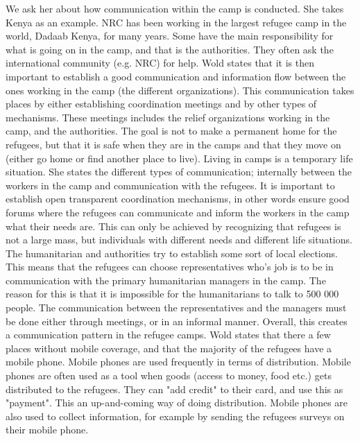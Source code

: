 We ask her about how communication within the camp is conducted. She takes Kenya as an example. NRC has been working in the largest refugee camp in the world, Dadaab Kenya, for many years.  Some have the main responsibility for what is going on in the camp, and that is the  authorities. They often ask the international community (e.g. NRC) for help. Wold states that it is then important to establish a good communication and information flow between the ones working in the camp (the different organizations). This communication takes places by either establishing coordination meetings and by other types of mechanisms. These meetings includes the relief organizations working in the camp, and the authorities. The goal is not to make a permanent home for the refugees, but that it is safe when they are in the camps and that they move on (either go home or find another place to live). Living in camps is a temporary life situation. She states the different types of communication; internally between the workers in the camp and communication with the refugees. It is important to establish open transparent coordination mechanisms, in other words ensure good forums where the refugees can communicate and inform the workers in the camp what their needs are. This can only be achieved by recognizing that refugees is not a large mass, but individuals with different needs and different life situations. The humanitarian and authorities try to establish some sort of local elections. This means that the refugees can choose representatives who's job is to be in communication with the primary humanitarian managers in the camp. The reason for this is that it is impossible for the humanitarians to talk to 500 000 people. The communication between the representatives and the managers must be done either through meetings, or in an informal manner. Overall, this creates a communication pattern in the refugee camps. Wold states that there a few places without mobile coverage, and that the majority of the refugees have a mobile phone. Mobile phones are used frequently in terms of distribution. Mobile phones are often used as a tool when goods (access to money, food etc.) gets distributed to the refugees. They can "add credit" to their card, and use this as "payment". This an up-and-coming way of doing distribution. Mobile phones are also used to collect information, for example by sending the refugees surveys on their mobile phone. 


